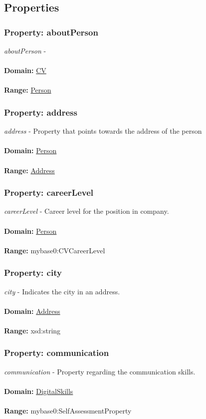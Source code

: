 \documentclass[a4paper,12pt]{article}
\numberwithin{equation}{section}
\begin{document}
\subsection{Properties}
\subsubsection{Property: aboutPerson}\hypertarget{aboutPerson}{}
\textit{aboutPerson} - 
\\\\
\textbf{Domain:} \hyperlink{CV}{CV} 
\\\\
\textbf{Range:}  \hyperlink{Person}{Person} 

\subsubsection{Property: address}\hypertarget{address}{}
\textit{address} - Property that points towards the address of the person
\\\\
\textbf{Domain:} \hyperlink{Person}{Person} 
\\\\
\textbf{Range:}  \hyperlink{Address}{Address} 

\subsubsection{Property: careerLevel}\hypertarget{careerLevel}{}
\textit{careerLevel} - Career level for the position in company.
\\\\
\textbf{Domain:} \hyperlink{Person}{Person} 
\\\\
\textbf{Range:}  mybase0:CVCareerLevel

\subsubsection{Property: city}\hypertarget{city}{}
\textit{city} - Indicates the city in an address.
\\\\
\textbf{Domain:} \hyperlink{Address}{Address}
\\\\
\textbf{Range:}  xsd:string

\subsubsection{Property: communication}\hypertarget{communication}{}
\textit{communication} - Property regarding the communication skills.
\\\\
\textbf{Domain:} \hyperlink{DigitalSkills}{DigitalSkills} 
\\\\
\textbf{Range:}  mybase0:SelfAssessmentProperty
\end{document}

